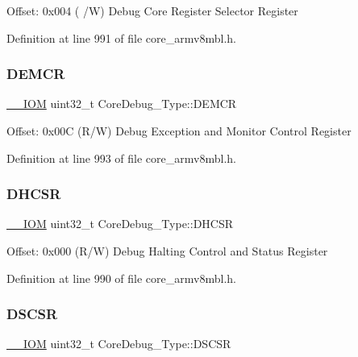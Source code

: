 Offset\+: 0x004 ( /W) Debug Core Register Selector Register 

Definition at line 991 of file core\+\_\+armv8mbl.\+h.

\mbox{\label{struct_core_debug___type_aeb3126abc4c258a858f21f356c0df6ee}} 
\subsubsection{\texorpdfstring{D\+E\+M\+CR}{DEMCR}}
{\footnotesize\ttfamily \hyperlink{core__sc300_8h_ab6caba5853a60a17e8e04499b52bf691}{\+\_\+\+\_\+\+I\+OM} uint32\+\_\+t Core\+Debug\+\_\+\+Type\+::\+D\+E\+M\+CR}

Offset\+: 0x00C (R/W) Debug Exception and Monitor Control Register 

Definition at line 993 of file core\+\_\+armv8mbl.\+h.

\mbox{\label{struct_core_debug___type_ad63554e4650da91a8e79929cbb63db66}} 
\subsubsection{\texorpdfstring{D\+H\+C\+SR}{DHCSR}}
{\footnotesize\ttfamily \hyperlink{core__sc300_8h_ab6caba5853a60a17e8e04499b52bf691}{\+\_\+\+\_\+\+I\+OM} uint32\+\_\+t Core\+Debug\+\_\+\+Type\+::\+D\+H\+C\+SR}

Offset\+: 0x000 (R/W) Debug Halting Control and Status Register 

Definition at line 990 of file core\+\_\+armv8mbl.\+h.

\mbox{\label{struct_core_debug___type_ad9fa5e915e038e20b9be88d54d432fb8}} 
\subsubsection{\texorpdfstring{D\+S\+C\+SR}{DSCSR}}
{\footnotesize\ttfamily \hyperlink{core__sc300_8h_ab6caba5853a60a17e8e04499b52bf691}{\+\_\+\+\_\+\+I\+OM} uint32\+\_\+t Core\+Debug\+\_\+\+Type\+::\+D\+S\+C\+SR}

